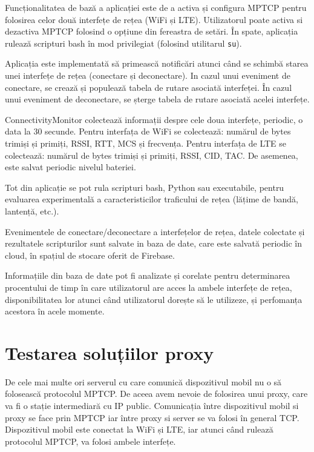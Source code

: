 Funcționalitatea de bază a aplicației este de a activa și configura MPTCP pentru folosirea celor două interfețe de rețea (WiFi și LTE). Utilizatorul poate activa si dezactiva MPTCP folosind o opțiune din fereastra de setări. În spate, aplicația rulează scripturi bash în mod privilegiat (folosind utilitarul \texttt{su}).

Aplicația este implementată să primească notificări atunci când se schimbă starea unei interfețe de rețea (conectare și deconectare). In cazul unui eveniment de conectare, se crează și populează tabela de rutare asociată interfeței. În cazul unui eveniment de deconectare, se șterge tabela de rutare asociată acelei interfețe.

ConnectivityMonitor colectează informații despre cele doua interfețe, periodic, o data la 30 secunde. Pentru interfața de WiFi se colectează: numărul de bytes trimiși și primiți, RSSI, RTT, MCS și frecvența. Pentru interfața de LTE se colectează: numărul de bytes trimiși și primiți, RSSI, CID, TAC. De asemenea, este salvat periodic nivelul bateriei. 

Tot din aplicație se pot rula scripturi bash, Python sau executabile, pentru evaluarea experimentală a caracteristicilor traficului de rețea (lățime de bandă, lantență, etc.).

Evenimentele de conectare/deconectare a interfețelor de rețea, datele colectate și rezultatele scripturilor sunt salvate in baza de date, care este salvată periodic în cloud, în spațiul de stocare oferit de Firebase. 

Informațiile din baza de date pot fi analizate și corelate pentru determinarea procentului de timp în care utilizatorul are acces la ambele interfețe de rețea, disponibilitatea lor atunci când utilizatorul dorește să le utilizeze, și perfomanța acestora în  acele momente.

\section{Testarea soluțiilor proxy}

De cele mai multe ori serverul cu care comunică dispozitivul mobil nu o să folosească protocolul MPTCP. De aceea avem nevoie de folosirea unui proxy, care va fi o stație intermediară cu IP public. Comunicația între dispozitivul mobil si proxy se face prin MPTCP iar între proxy si server se va folosi în general TCP. Dispozitivul mobil este conectat la WiFi și LTE, iar atunci când rulează protocolul MPTCP, va folosi ambele interfețe.

